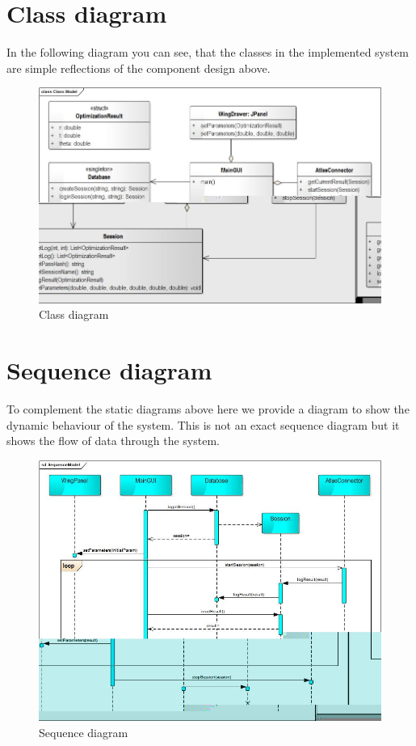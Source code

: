 \documentclass[10pt,a4paper]{report}
\begin{document}
\section{Class diagram}
In the following diagram you can see, that the classes in the implemented system are simple reflections of the component design above.
\begin{figure}[h!]
\includegraphics[width=\textwidth]{ClassModel.jpg}
\caption{Class diagram}
\end{figure}
\pagebreak
\section{Sequence diagram}
To complement the static diagrams above here we provide a diagram to show the dynamic behaviour of the system. This is not an exact sequence diagram but it shows the flow of data through the system.
\begin{figure}[h!]
\includegraphics[width=\textwidth]{SequenceModel.jpg}
\caption{Sequence diagram}
\end{figure}
\end{document}
